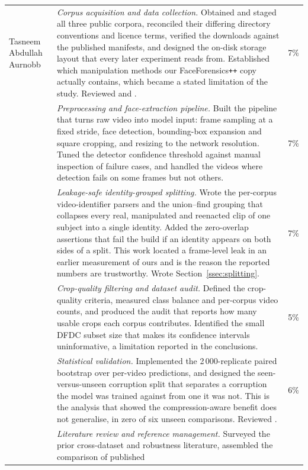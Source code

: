 \documentclass[journal,onecolumn]{IEEEtran}
\begin{document}
{\begin{longtable}{p{30mm}p{88mm}r}
Tasneem Abdullah Aurnobb &
\emph{Corpus acquisition and data collection.} Obtained and staged all three
public corpora, reconciled their differing directory conventions and licence
terms, verified the downloads against the published manifests, and designed the
on-disk storage layout that every later experiment reads from. Established which
manipulation methods our FaceForensics\texttt{++} copy actually contains, which
became a stated limitation of the study. Reviewed
\cite{rossler2019faceforensics} and \cite{li2020celebdf}. & 7\% \\
\addlinespace
&
\emph{Preprocessing and face-extraction pipeline.} Built the pipeline that turns
raw video into model input: frame sampling at a fixed stride, face detection,
bounding-box expansion and square cropping, and resizing to the network
resolution. Tuned the detector confidence threshold against manual inspection of
failure cases, and handled the videos where detection fails on some frames but
not others. & 7\% \\
\addlinespace
&
\emph{Leakage-safe identity-grouped splitting.} Wrote the per-corpus
video-identifier parsers and the union--find grouping that collapses every
real, manipulated and reenacted clip of one subject into a single identity.
Added the zero-overlap assertions that fail the build if an identity appears on
both sides of a split. This work located a frame-level leak in an earlier
measurement of ours and is the reason the reported numbers are trustworthy.
Wrote Section~\ref{ssec:splitting}. & 7\% \\
\addlinespace
&
\emph{Crop-quality filtering and dataset audit.} Defined the crop-quality
criteria, measured class balance and per-corpus video counts, and produced the
audit that reports how many usable crops each corpus contributes. Identified the
small DFDC subset size that makes its confidence intervals uninformative, a
limitation reported in the conclusions. & 5\% \\
\addlinespace
&
\emph{Statistical validation.} Implemented the 2\,000-replicate paired bootstrap
over per-video predictions, and designed the seen-versus-unseen corruption split
that separates a corruption the model was trained against from one it was not.
This is the analysis that showed the compression-aware benefit does not
generalise, in zero of six unseen comparisons. Reviewed
\cite{hendrycks2019robustness}. & 6\% \\
\addlinespace
&
\emph{Literature review and reference management.} Surveyed the prior
cross-dataset and robustness literature, assembled the comparison of published

\end{longtable}}
\end{document}
